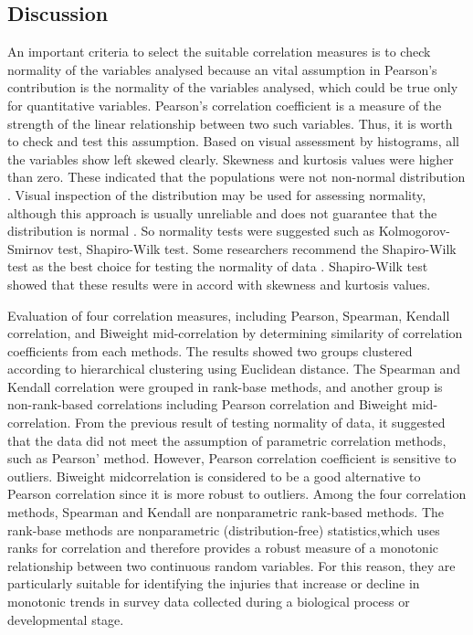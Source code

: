 \subsection{Discussion}

An important criteria to select the suitable correlation measures is to check normality of the variables analysed because an vital assumption in Pearson’s contribution is the normality of the variables analysed, which could be true only for quantitative variables. Pearson’s correlation coefficient is a measure of the strength of the linear relationship between two such variables. Thus, it is worth to check and test this assumption. Based on visual assessment by histograms, all the variables show left skewed clearly. Skewness and kurtosis values were higher than zero. These indicated that the populations were not non-normal distribution  \citet{Doane_2011_Measuring}. Visual inspection of the distribution may be used for assessing normality, although this approach is usually unreliable and does not guarantee that the distribution is normal \citep{Ghasemi_2012_Normality}. So normality tests were suggested such as Kolmogorov-Smirnov test, Shapiro-Wilk test. Some researchers recommend the Shapiro-Wilk test as the best choice for testing the normality of data \citep{Peat_2005_Guide}. Shapiro-Wilk test showed that these results were in accord with skewness and kurtosis values.

Evaluation of four correlation measures, including Pearson, Spearman, Kendall correlation, and Biweight mid-correlation by determining similarity of correlation coefficients from each methods. The results showed two groups clustered according to hierarchical clustering using Euclidean distance. The Spearman and Kendall correlation were grouped in rank-base methods, and another group is non-rank-based correlations including Pearson correlation and Biweight mid-correlation. From the previous result of testing normality of data, it suggested that the data did not meet the assumption of parametric correlation methods, such as Pearson' method. However, Pearson correlation coefficient is sensitive to outliers. Biweight midcorrelation is considered to be a good alternative to Pearson correlation since it is more robust to outliers\citep{Wilcox_2012_Introduction}. Among the four correlation methods, Spearman and Kendall are nonparametric rank-based methods. The rank-base methods are nonparametric (distribution-free) statistics,which uses ranks for correlation and therefore provides a robust measure of a monotonic relationship between two continuous random variables. For this reason, they are particularly suitable for identifying the injuries that increase or decline in monotonic trends in survey data collected during a biological process or developmental stage.

